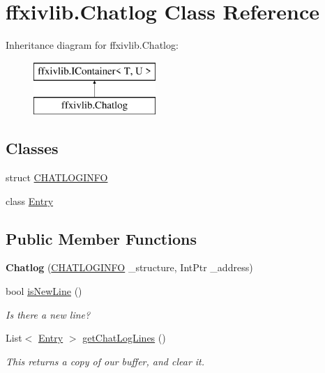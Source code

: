 \hypertarget{classffxivlib_1_1_chatlog}{\section{ffxivlib.\-Chatlog Class Reference}
\label{classffxivlib_1_1_chatlog}
}
Inheritance diagram for ffxivlib.\-Chatlog\-:\begin{figure}[H]
\begin{center}
\leavevmode
\includegraphics[height=2.000000cm]{classffxivlib_1_1_chatlog}
\end{center}
\end{figure}
\subsection*{Classes}
\begin{DoxyCompactItemize}
\item 
struct \hyperlink{structffxivlib_1_1_chatlog_1_1_c_h_a_t_l_o_g_i_n_f_o}{C\-H\-A\-T\-L\-O\-G\-I\-N\-F\-O}
\item 
class \hyperlink{classffxivlib_1_1_chatlog_1_1_entry}{Entry}
\end{DoxyCompactItemize}
\subsection*{Public Member Functions}
\begin{DoxyCompactItemize}
\item 
\hypertarget{classffxivlib_1_1_chatlog_a53c25c1503ad108ef62dd0d3129c91a1}{{\bfseries Chatlog} (\hyperlink{structffxivlib_1_1_chatlog_1_1_c_h_a_t_l_o_g_i_n_f_o}{C\-H\-A\-T\-L\-O\-G\-I\-N\-F\-O} \-\_\-structure, Int\-Ptr \-\_\-address)}\label{classffxivlib_1_1_chatlog_a53c25c1503ad108ef62dd0d3129c91a1}

\item 
bool \hyperlink{classffxivlib_1_1_chatlog_a983c8ce71a040d267e5e90dc211f796b}{is\-New\-Line} ()
\begin{DoxyCompactList}\small\item\em Is there a new line? \end{DoxyCompactList}\item 
List$<$ \hyperlink{classffxivlib_1_1_chatlog_1_1_entry}{Entry} $>$ \hyperlink{classffxivlib_1_1_chatlog_a488ad6fe312a5b1393565fda53643889}{get\-Chat\-Log\-Lines} ()
\begin{DoxyCompactList}\small\item\em This returns a copy of our buffer, and clear it. \end{DoxyCompactList}\end{DoxyCompactItemize}
